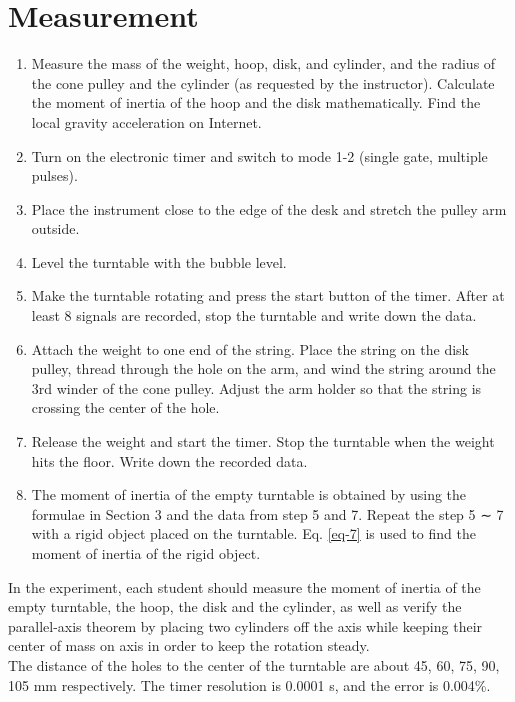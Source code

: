 \documentclass{article}
\begin{document}
\section{Measurement}
\begin{enumerate}
\item
Measure the mass of the weight, hoop, disk, and cylinder, and the radius of the cone
pulley and the cylinder (as requested by the instructor). Calculate the moment of
inertia of the hoop and the disk mathematically. Find the local gravity acceleration
on Internet.
\item
Turn on the electronic timer and switch to mode 1-2 (single gate, multiple pulses).
\item
Place the instrument close to the edge of the desk and stretch the pulley arm outside.
\item
Level the turntable with the bubble level.
\item
Make the turntable rotating and press the start button of the timer. After at least
8 signals are recorded, stop the turntable and write down the data.
\item
Attach the weight to one end of the string. Place the string on the disk pulley,
thread through the hole on the arm, and wind the string around the 3rd winder of
the cone pulley. Adjust the arm holder so that the string is crossing the center of
the hole.
\item
Release the weight and start the timer. Stop the turntable when the weight hits the
floor. Write down the recorded data.
\item
The moment of inertia of the empty turntable is obtained by using the formulae in
Section 3 and the data from step 5 and 7. Repeat the step 5 ∼ 7 with a rigid object
placed on the turntable. Eq. \ref{eq-7} is used to find the moment of inertia of the rigid
object.

\end{enumerate}

In the experiment, each student should measure the moment of inertia of the empty
turntable, the hoop, the disk and the cylinder, as well as verify the parallel-axis theorem
by placing two cylinders off the axis while keeping their center of mass on axis in order
to keep the rotation steady.\\

The distance of the holes to the center of the turntable are about 45, 60, 75, 90, 105
mm respectively. The timer resolution is 0.0001 s, and the error is 0.004\%.
\end{document}
